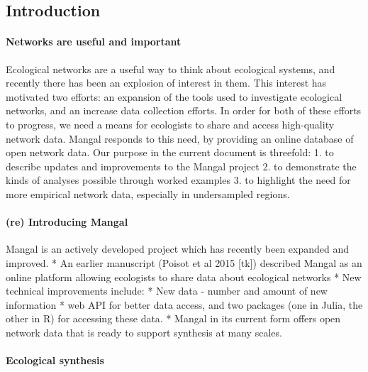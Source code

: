 \hypertarget{introduction}{%
\subsection{Introduction}\label{introduction}}

\hypertarget{networks-are-useful-and-important}{%
\paragraph{Networks are useful and
important}\label{networks-are-useful-and-important}}

Ecological networks are a useful way to think about ecological systems,
and recently there has been an explosion of interest in them. This
interest has motivated two efforts: an expansion of the tools used to
investigate ecological networks, and an increase data collection
efforts. In order for both of these efforts to progress, we need a means
for ecologists to share and access high-quality network data. Mangal
responds to this need, by providing an online database of open network
data. Our purpose in the current document is threefold: 1. to describe
updates and improvements to the Mangal project 2. to demonstrate the
kinds of analyses possible through worked examples 3. to highlight the
need for more empirical network data, especially in undersampled
regions.

\hypertarget{re-introducing-mangal}{%
\paragraph{(re) Introducing Mangal}\label{re-introducing-mangal}}

Mangal is an actively developed project which has recently been expanded
and improved. * An earlier manuscript (Poisot et al 2015 {[}tk{]})
described Mangal as an online platform allowing ecologists to share data
about ecological networks * New technical improvements include: * New
data - number and amount of new information * web API for better data
access, and two packages (one in Julia, the other in R) for accessing
these data. * Mangal in its current form offers open network data that
is ready to support synthesis at many scales.

\hypertarget{ecological-synthesis}{%
\paragraph{Ecological synthesis}\label{ecological-synthesis}}

